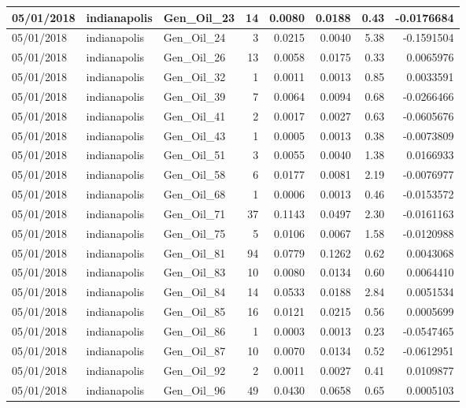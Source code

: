 \documentclass[
  letterpaper,
  DIV=11,
  numbers=noendperiod]{scrartcl}
\begin{document}
\begin{tabular}{l|l|l|r|r|r|r|r}
\hline
05/01/2018 & indianapolis & Gen\_Oil\_23 & 14 & 0.0080 & 0.0188 & 0.43 & -0.0176684\\
\hline
05/01/2018 & indianapolis & Gen\_Oil\_24 & 3 & 0.0215 & 0.0040 & 5.38 & -0.1591504\\
\hline
05/01/2018 & indianapolis & Gen\_Oil\_26 & 13 & 0.0058 & 0.0175 & 0.33 & 0.0065976\\
\hline
05/01/2018 & indianapolis & Gen\_Oil\_32 & 1 & 0.0011 & 0.0013 & 0.85 & 0.0033591\\
\hline
05/01/2018 & indianapolis & Gen\_Oil\_39 & 7 & 0.0064 & 0.0094 & 0.68 & -0.0266466\\
\hline
05/01/2018 & indianapolis & Gen\_Oil\_41 & 2 & 0.0017 & 0.0027 & 0.63 & -0.0605676\\
\hline
05/01/2018 & indianapolis & Gen\_Oil\_43 & 1 & 0.0005 & 0.0013 & 0.38 & -0.0073809\\
\hline
05/01/2018 & indianapolis & Gen\_Oil\_51 & 3 & 0.0055 & 0.0040 & 1.38 & 0.0166933\\
\hline
05/01/2018 & indianapolis & Gen\_Oil\_58 & 6 & 0.0177 & 0.0081 & 2.19 & -0.0076977\\
\hline
05/01/2018 & indianapolis & Gen\_Oil\_68 & 1 & 0.0006 & 0.0013 & 0.46 & -0.0153572\\
\hline
05/01/2018 & indianapolis & Gen\_Oil\_71 & 37 & 0.1143 & 0.0497 & 2.30 & -0.0161163\\
\hline
05/01/2018 & indianapolis & Gen\_Oil\_75 & 5 & 0.0106 & 0.0067 & 1.58 & -0.0120988\\
\hline
05/01/2018 & indianapolis & Gen\_Oil\_81 & 94 & 0.0779 & 0.1262 & 0.62 & 0.0043068\\
\hline
05/01/2018 & indianapolis & Gen\_Oil\_83 & 10 & 0.0080 & 0.0134 & 0.60 & 0.0064410\\
\hline
05/01/2018 & indianapolis & Gen\_Oil\_84 & 14 & 0.0533 & 0.0188 & 2.84 & 0.0051534\\
\hline
05/01/2018 & indianapolis & Gen\_Oil\_85 & 16 & 0.0121 & 0.0215 & 0.56 & 0.0005699\\
\hline
05/01/2018 & indianapolis & Gen\_Oil\_86 & 1 & 0.0003 & 0.0013 & 0.23 & -0.0547465\\
\hline
05/01/2018 & indianapolis & Gen\_Oil\_87 & 10 & 0.0070 & 0.0134 & 0.52 & -0.0612951\\
\hline
05/01/2018 & indianapolis & Gen\_Oil\_92 & 2 & 0.0011 & 0.0027 & 0.41 & 0.0109877\\
\hline
05/01/2018 & indianapolis & Gen\_Oil\_96 & 49 & 0.0430 & 0.0658 & 0.65 & 0.0005103\\

\end{tabular}
\end{document}

